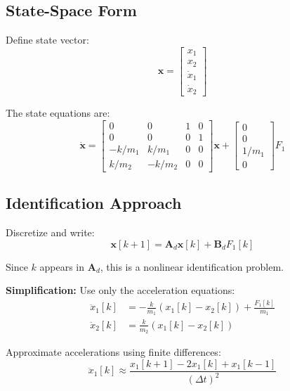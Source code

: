 \subsection{State-Space Form}

Define state vector:
\begin{equation}
\mathbf{x} = \begin{bmatrix} x_1 \\ x_2 \\ \dot{x}_1 \\ \dot{x}_2 \end{bmatrix}
\end{equation}

The state equations are:
\begin{equation}
\dot{\mathbf{x}} = \begin{bmatrix}
0 & 0 & 1 & 0 \\
0 & 0 & 0 & 1 \\
-k/m_1 & k/m_1 & 0 & 0 \\
k/m_2 & -k/m_2 & 0 & 0
\end{bmatrix} \mathbf{x} + \begin{bmatrix} 0 \\ 0 \\ 1/m_1 \\ 0 \end{bmatrix} F_1
\end{equation}

\subsection{Identification Approach}

Discretize and write:
\begin{equation}
\mathbf{x}[k+1] = \mathbf{A}_d \mathbf{x}[k] + \mathbf{B}_d F_1[k]
\end{equation}

Since $k$ appears in $\mathbf{A}_d$, this is a nonlinear identification problem.

\textbf{Simplification:} Use only the acceleration equations:
\begin{align}
\ddot{x}_1[k] &= -\frac{k}{m_1}(x_1[k] - x_2[k]) + \frac{F_1[k]}{m_1} \\
\ddot{x}_2[k] &= \frac{k}{m_2}(x_1[k] - x_2[k])
\end{align}

Approximate accelerations using finite differences:
\begin{equation}
\ddot{x}_1[k] \approx \frac{x_1[k+1] - 2x_1[k] + x_1[k-1]}{(\Delta t)^2}
\end{equation}

